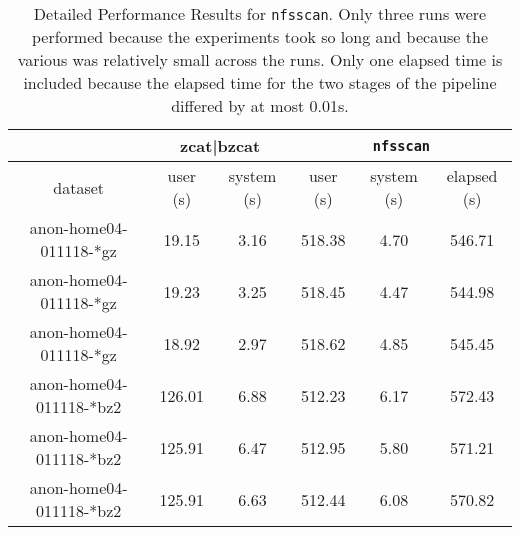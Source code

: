\begin{table*}
\begin{tabular}{|c|c|c|c|c|c|} \hline
& \multicolumn{2}{c|}{zcat|bzcat} & \multicolumn{3}{c|}{\texttt{nfsscan}} \\ \hline
 dataset & user (s) & system (s) & user (s)& system (s)& elapsed (s)\\ \hline

anon-home04-011118-*gz  & 19.15  & 3.16 & 518.38 & 4.70 & 546.71 \\
anon-home04-011118-*gz  & 19.23  & 3.25 & 518.45 & 4.47 & 544.98 \\
anon-home04-011118-*gz  & 18.92  & 2.97 & 518.62 & 4.85 & 545.45 \\

anon-home04-011118-*bz2 & 126.01 & 6.88 & 512.23 & 6.17 & 572.43 \\
anon-home04-011118-*bz2 & 125.91 & 6.47 & 512.95 & 5.80 & 571.21 \\
anon-home04-011118-*bz2 & 125.91 & 6.63 & 512.44 & 6.08 & 570.82 \\ \hline
\end{tabular}

\caption{Detailed Performance Results for \texttt{nfsscan}.  Only
three runs were performed because the experiments took so long and
because the various was relatively small across the runs.  Only one
elapsed time is included because the elapsed time for the two stages
of the pipeline differed by at most 0.01s.}

\label{tab:nfsscan}
\end{table*}

